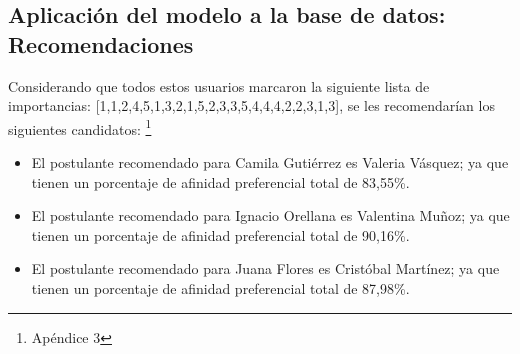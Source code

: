 \documentclass[a4paper]{article}
\begin{document}
\subsection{Aplicación del modelo a la base de datos: Recomendaciones}
Considerando que todos estos usuarios marcaron la siguiente lista de importancias: [1,1,2,4,5,1,3,2,1,5,2,3,3,5,4,4,4,2,2,3,1,3], se les recomendarían los siguientes candidatos: \footnote{Apéndice 3}
\begin{itemize}
    \item El postulante recomendado para Camila Gutiérrez es Valeria Vásquez; ya que tienen un porcentaje de afinidad preferencial total de 83,55\%.
    \item El postulante recomendado para Ignacio Orellana es Valentina Muñoz; ya que tienen un porcentaje de afinidad preferencial total de 90,16\%.
    \item El postulante recomendado para Juana Flores es Cristóbal Martínez; ya que tienen un porcentaje de afinidad preferencial total de 87,98\%.
\end{itemize}
\end{document}

